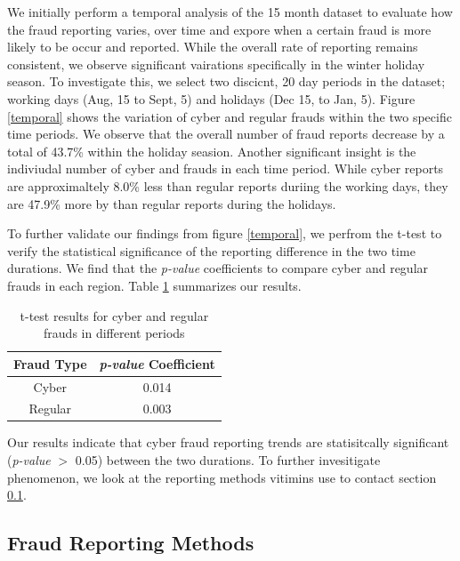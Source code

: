 \documentclass[conference]{IEEEtran}
\begin{document}
We initially perform a temporal analysis of the 15 month dataset to evaluate how the fraud reporting varies, over time and expore when a certain fraud is more likely to be occur and reported. While the overall rate of reporting remains consistent, we observe significant vairations specifically in the winter holiday season. To investigate this, we select two discicnt, 20 day periods in the dataset; working days (Aug, 15  to Sept, 5) and holidays (Dec 15, to Jan, 5). Figure \ref{temporal} shows the variation of cyber and regular frauds within the two specific time periods. We observe that the overall number of fraud reports decrease by a total of 43.7\% within the holiday seasion. Another significant insight is the indiviudal number of cyber and frauds in each time period. While cyber reports are approximaltely 8.0\% less than regular reports duriing the working days, they are 47.9\% more by than regular reports during the holidays.

To further validate our findings from figure \ref{temporal}, we perfrom the t-test to verify the statistical significance of the reporting difference in the two time durations. We find that the \emph{p-value} coefficients to compare cyber and regular frauds in each region. Table \ref{ttest} summarizes our results.

\smallskip
\begin{table}[h]
\centering
\begin{tabular}{cc}
\hline
\multicolumn{1}{c}{\bfseries Fraud Type} & \multicolumn{1}{c}{\bfseries \emph{p-value}
Coefficient}
\\
\hline
\hline
Cyber & 0.014\\
\hline
Regular & 0.003\\
\hline
\end{tabular}
\smallskip
\caption{t-test results for cyber and regular frauds in different periods}\label{ttest}
\end{table}

Our results indicate that cyber fraud reporting trends are statisitcally significant (\emph{p-value} $>$ 0.05) between the two durations. To further invesitigate phenomenon, we look at the reporting methods vitimins use to contact section \ref{reportingmethods}.

\subsection{Fraud Reporting Methods}\label{reportingmethods}
\end{document}
